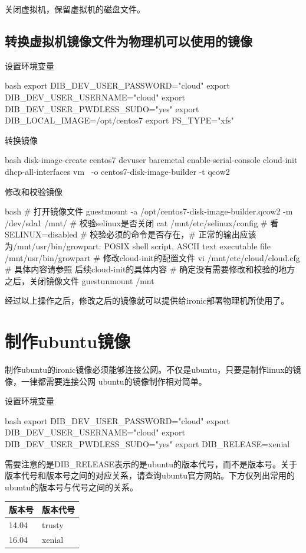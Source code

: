 关闭虚拟机，保留虚拟机的磁盘文件。

\subsection{转换虚拟机镜像文件为物理机可以使用的镜像}

设置环境变量
\begin{code-block}{bash}
export DIB_DEV_USER_PASSWORD="cloud"
export DIB_DEV_USER_USERNAME="cloud"
export DIB_DEV_USER_PWDLESS_SUDO="yes"
export DIB_LOCAL_IMAGE=/opt/centos7
export FS_TYPE="xfs"
\end{code-block}

转换镜像
\begin{code-block}{bash}
disk-image-create centos7 devuser baremetal enable-serial-console cloud-init dhcp-all-interfaces vm \
        -o centos7-disk-image-builder -t qcow2
\end{code-block}

修改和校验镜像
\begin{code-block}{bash}
# 打开镜像文件
guestmount -a /opt/centos7-disk-image-builder.qcow2 -m /dev/sda1 /mnt/
# 校验selinux是否关闭
cat /mnt/etc/selinux/config # 看SELINUX=disabled
# 校验必须的命令是否存在，# 正常的输出应该为/mnt/usr/bin/growpart: POSIX shell script, ASCII text executable
file /mnt/usr/bin/growpart
# 修改cloud-init的配置文件
vi /mnt/etc/cloud/cloud.cfg
# 具体内容请参照 后续cloud-init的具体内容
# 确定没有需要修改和校验的地方之后，关闭镜像文件
guestunmount /mnt
\end{code-block}

经过以上操作之后，修改之后的镜像就可以提供给ironic部署物理机所使用了。

\section{制作ubuntu镜像}
制作ubuntu的ironic镜像必须能够连接公网。不仅是ubuntu，只要是制作linux的镜像，一律都需要连接公网
ubuntu的镜像制作相对简单。

设置环境变量
\begin{code-block}{bash}
export DIB_DEV_USER_PASSWORD="cloud"
export DIB_DEV_USER_USERNAME="cloud"
export DIB_DEV_USER_PWDLESS_SUDO="yes"
export DIB_RELEASE=xenial
\end{code-block}

需要注意的是DIB\_RELEASE表示的是ubuntu的版本代号，而不是版本号。关于版本代号和版本号之间的对应关系，请查询ubuntu官方网站。下方仅列出常用的ubuntu的版本号与代号之间的关系。
\begin{center}
  \begin{tabularx}{0.2\textwidth}{|l|l|}
  \hline
  版本号& 版本代号\\ \hline
  14.04 & trusty \\
  16.04 & xenial \\
  \hline
  \end{tabularx}
  \label{tab:Binary files}
\end{center}

